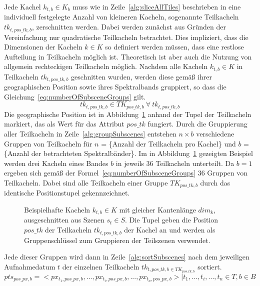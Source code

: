 Jede Kachel $k_{t, b} \in K_{b}$ muss wie in Zeile~\ref{alg:sliceAllTiles} beschrieben in eine individuell festgelegte Anzahl von kleineren Kacheln, sogenannte Teilkacheln $tk_{t, pos\_tk, b}$, zerschnitten werden. Dabei werden zunächst aus Gründen der Vereinfachung nur quadratische Teilkacheln betrachtet. Dies impliziert, dass die Dimensionen der Kacheln $k \in K$ so definiert werden müssen, dass eine restlose Aufteilung in Teilkacheln möglich ist. Theoretisch ist aber auch die Nutzung von allgemein rechteckigen Teilkacheln möglich. Nachdem alle Kacheln $k_{t, b} \in K$ in Teilkacheln $tk_{t, pos\_tk, b}$ geschnitten wurden, werden diese gemäß ihrer geographischen Position sowie ihres Spektralbands gruppiert, so dass die Gleichung~\ref{eq:numberOfSubsceneGroups} gilt.
%
\begin{equation} \label{eq:numberOfSubsceneGroups}
tk_{t, pos\_tk, b} \in TK_{pos\_tk, b}\ \forall\ tk_{t, pos\_tk, b}
\end{equation}
%
Die geographische Position ist in Abbildung~\ref{fig:dataCubeSliced} anhand der Tupel der Teilkacheln markiert, das als Wert für das Attribut $pos\_tk$ fungiert. Durch die Gruppierung aller Teilkacheln in Zeile~\ref{alg:groupSubscenes} entstehen $n \times b$  verschiedene Gruppen von Teilkacheln für $n$ = \{Anzahl der Teilkacheln pro Kachel\} und $b$ = \{Anzahl der betrachteten Spektralbänder\}. Im in Abbildung~\ref{fig:dataCubeSliced} gezeigten Beispiel werden drei Kacheln eines Bandes $b$ in jeweils 36 Teilkacheln unterteilt. Da $b=1$ ergeben sich gemäß der Formel~\ref{eq:numberOfSubsceneGroups} 36 Gruppen von Teilkacheln. Dabei sind alle Teilkacheln einer Gruppe $TK_{pos\_tk, b}$ durch das identische Positionstupel gekennzeichnet.
%
\begin{figure}[H]
\centering

\caption{Beispielhafte Kacheln $k_{t, b} \in K$ mit gleicher Kantenlänge $dim_k$, ausgeschnitten aus Szenen $s_t \in S$. Die Tupel geben die Position $pos\_tk$ der Teilkacheln $tk_{t, pos\_tk, b}$ der Kachel an und werden als Gruppenschlüssel zum Gruppieren der Teilszenen verwendet.} 
\label{fig:dataCubeSliced}
\end{figure}
%
Jede dieser Gruppen wird dann in Zeile~\ref{alg:sortSubscenes} nach dem jeweiligen Aufnahmedatum $t$ der einzelnen Teilkacheln $tk_{t, pos\_tk, b \in TK_{pos\_tk, b}}$ sortiert. 
%
\begin{equation} \label{eq:pixelTimeSeries}
pts_{pos\_px, b} = <px_{t_1, pos\_px, b}, ..., px_{t_i, pos\_px, b}, ... , px_{t_n, pos\_px, b}> | t_1, ..., t_i, ..., t_n \in T, b\in B
\end{equation}
